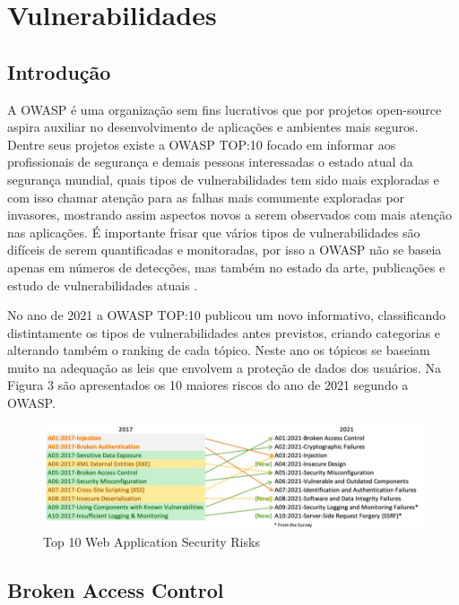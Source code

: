 \chapter{Vulnerabilidades}

\section{Introdução}

A OWASP é uma organização sem fins lucrativos que por projetos open-source aspira auxiliar no desenvolvimento de aplicações e ambientes mais seguros. Dentre seus projetos existe a OWASP TOP:10 focado em informar aos profissionais de segurança e demais pessoas interessadas o estado atual da segurança mundial, quais tipos de vulnerabilidades tem sido mais exploradas e com isso chamar atenção para as falhas mais comumente exploradas por invasores, mostrando assim aspectos novos a serem observados com mais atenção nas aplicações. É importante frisar que vários tipos de vulnerabilidades são difíceis de serem quantificadas e monitoradas, por isso a OWASP não se baseia apenas em números de detecções, mas também no estado da arte, publicações e estudo de vulnerabilidades atuais \cite{url:OWASP}.

No ano de 2021 a OWASP TOP:10 publicou um novo informativo, classificando distintamente os tipos de vulnerabilidades antes previstos, criando categorias e alterando também o ranking de cada tópico. Neste ano os tópicos se baseiam muito na adequação as leis que envolvem a proteção de dados dos usuários. Na Figura 3 são apresentados os 10 maiores riscos do ano de 2021 segundo a OWASP.

\begin{figure}[!htb]
     \centering
     \includegraphics[width=15cm]{mapping.png}
     \caption{Top 10 Web Application Security Risks~\cite{url:OWASP}}
     \label{Label de referência para a imagem}
\end{figure}


\section{Broken Access Control}

